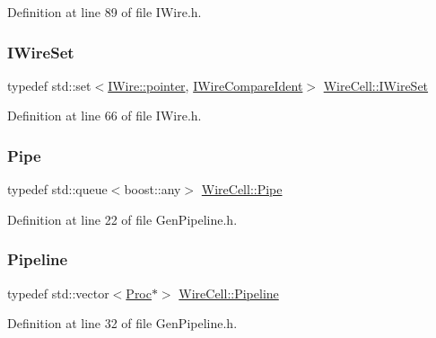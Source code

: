 Definition at line 89 of file I\+Wire.\+h.

\mbox{\label{namespace_wire_cell_a18a6e1194ae1b701ea3ce7f931304e19}} 
\subsubsection{\texorpdfstring{I\+Wire\+Set}{IWireSet}}
{\footnotesize\ttfamily typedef std\+::set$<$\hyperlink{class_wire_cell_1_1_i_data_aff870b3ae8333cf9265941eef62498bc}{I\+Wire\+::pointer}, \hyperlink{struct_wire_cell_1_1_i_wire_compare_ident}{I\+Wire\+Compare\+Ident}$>$ \hyperlink{namespace_wire_cell_a18a6e1194ae1b701ea3ce7f931304e19}{Wire\+Cell\+::\+I\+Wire\+Set}}



Definition at line 66 of file I\+Wire.\+h.

\mbox{\label{namespace_wire_cell_afce9bb01c731347c3d4c8ca9d4ed804f}} 
\subsubsection{\texorpdfstring{Pipe}{Pipe}}
{\footnotesize\ttfamily typedef std\+::queue$<$boost\+::any$>$ \hyperlink{namespace_wire_cell_afce9bb01c731347c3d4c8ca9d4ed804f}{Wire\+Cell\+::\+Pipe}}



Definition at line 22 of file Gen\+Pipeline.\+h.

\mbox{\label{namespace_wire_cell_a7f9ab409f961e35f837782a615c0020f}} 
\subsubsection{\texorpdfstring{Pipeline}{Pipeline}}
{\footnotesize\ttfamily typedef std\+::vector$<$\hyperlink{class_wire_cell_1_1_proc}{Proc}$\ast$$>$ \hyperlink{namespace_wire_cell_a7f9ab409f961e35f837782a615c0020f}{Wire\+Cell\+::\+Pipeline}}



Definition at line 32 of file Gen\+Pipeline.\+h.


